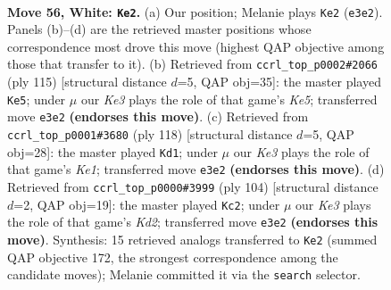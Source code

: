\documentclass[11pt]{article}
\begin{document}
\clearpage

\begin{figure}[p]\centering
\begin{subfigure}{0.46\textwidth}\centering
\resizebox{\linewidth}{!}{%
\newchessgame
\chessboard[
  setfen={4k3/8/8/4p3/RP4r1/4K3/8/8 w - - 0 56},
  showmover=false,
  pgfstyle=straightmove, color=movearrow, markmove={e3-e2}
]}
\caption{}
\end{subfigure}\hfill
\begin{subfigure}{0.46\textwidth}\centering
\resizebox{\linewidth}{!}{%
\newchessgame
\chessboard[
  setfen={8/R3p1r1/4P3/8/4k2K/8/8/8 b - - 20 58},
  showmover=false,
  pgfstyle=straightmove, color=movearrow, markmove={e4-e5}
]}
\caption{}
\end{subfigure}
\\[4pt]
\begin{subfigure}{0.46\textwidth}\centering
\resizebox{\linewidth}{!}{%
\newchessgame
\chessboard[
  setfen={2R5/8/8/2P5/4k3/6P1/2r5/4K3 w - - 3 60},
  showmover=false,
  pgfstyle=straightmove, color=movearrow, markmove={e1-d1}
]}
\caption{}
\end{subfigure}\hfill
\begin{subfigure}{0.46\textwidth}\centering
\resizebox{\linewidth}{!}{%
\newchessgame
\chessboard[
  setfen={7r/8/7P/7R/2k5/8/1p1K4/8 w - - 0 53},
  showmover=false,
  pgfstyle=straightmove, color=movearrow, markmove={d2-c2}
]}
\caption{}
\end{subfigure}
\caption{\textbf{Move 56, White: \texttt{Ke2}.} (a) Our position; Melanie plays \texttt{Ke2} (\texttt{e3e2}). Panels (b)--(d) are the retrieved master positions whose correspondence most drove this move (highest QAP objective among those that transfer to it). (b) Retrieved from \texttt{ccrl\_top\_p0002\#2066} (ply 115) [structural distance $d$=5, QAP obj=35]: the master played \texttt{Ke5}; under $\mu$ our \emph{Ke3} plays the role of that game's \emph{Ke5}; transferred move \texttt{e3e2} \textbf{(endorses this move)}. (c) Retrieved from \texttt{ccrl\_top\_p0001\#3680} (ply 118) [structural distance $d$=5, QAP obj=28]: the master played \texttt{Kd1}; under $\mu$ our \emph{Ke3} plays the role of that game's \emph{Ke1}; transferred move \texttt{e3e2} \textbf{(endorses this move)}. (d) Retrieved from \texttt{ccrl\_top\_p0000\#3999} (ply 104) [structural distance $d$=2, QAP obj=19]: the master played \texttt{Kc2}; under $\mu$ our \emph{Ke3} plays the role of that game's \emph{Kd2}; transferred move \texttt{e3e2} \textbf{(endorses this move)}. Synthesis: 15 retrieved analogs transferred to \texttt{Ke2} (summed QAP objective 172, the strongest correspondence among the candidate moves); Melanie committed it via the \texttt{search} selector.}
\label{fig:thought-m110}
\end{figure}
\end{document}
